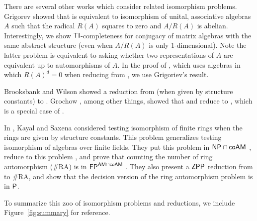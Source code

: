 There are several other works which consider related isomorphism problems. 
Grigorev \cite{Grigoriev83} showed that \GI is equivalent to 
isomorphism of unital, associative algebras $A$ such that the radical $R(A)$ 
squares to zero and $A/R(A)$ is abelian. Interestingly, we show 
$\mathsf{TI}$-completeness for conjugacy of 
matrix algebras with the same abstract structure (even when $A/R(A)$ is only 
1-dimensional). Note the latter problem is equivalent to asking whether two 
representations of $A$ are equivalent up to automorphisms of $A$. In the proof of , which uses algebras in which $R(A)^d=0$ when reducing from \DeeTI, we use Grigoriev's result.

Brooksbank and Wilson \cite{BW15} showed a reduction from  (when given by structure constants) to . 
Grochow \cite{GrochowLie}, among other things, showed that \GI and \CodeEq reduce to \MatLieConjlong, which is a special case of \MatSpConjlong.

In \cite{KS06}, Kayal and Saxena considered testing isomorphism of finite rings 
when the rings are given by structure constants. This problem 
generalizes testing isomorphism of algebras over finite fields. They 
put this problem in $\mathsf{NP} \cap \mathsf{coAM}$ \cite[Thm.~4.1]{KS06}, reduce \GI to 
this problem \cite[Thm.~4.4]{KS06}, and 
prove that counting the number of ring automorphism (\#RA) is in 
$\mathsf{FP}^{\mathsf{AM} 
\cap \mathsf{coAM}}$ \cite[Thm.~5.1]{KS06}. They also present a $\mathsf{ZPP}$ reduction 
from \GI to \#RA, 
and show that the decision version of the ring automorphism problem is in $\mathsf{P}$.


To summarize this zoo of isomorphism problems and reductions, we include Figure~\ref{fig:summary} for reference.

